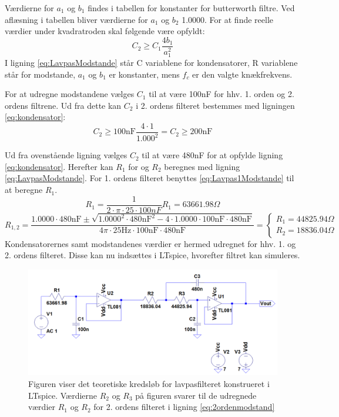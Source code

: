 \noindent Værdierne for $a_{1}$ og $b_{1}$ findes i tabellen for konstanter for butterworth filtre. Ved aflæsning i tabellen bliver værdierne for $a_{1}$  og  $b_{2}$ 1.0000. For at finde reelle værdier under kvadratroden skal følgende være opfyldt:
\begin{equation} \label{eq:kondensator}
C_2 \geq C_1 \frac{4b_1}{a_1^2}
\end{equation}
I ligning \ref{eq:LavpasModstande} står C variablene for kondensatorer, R variablene står for modstande, $a_1$ og $b_1$ er konstanter, mens $f_c$ er den valgte knækfrekvens. 

\noindent For at udregne modstandene vælges $C_1$ til at være 100nF for hhv. 1. orden og 2. ordens filtrene. Ud fra dette kan $C_2$ i 2. ordens filteret bestemmes med ligningen \ref{eq:kondensator}:
\begin{equation} 
C_2 \geq 100\text{nF} \frac{4\cdot 1}{1.000^2} = C_2 \geq 200\text{nF}
\end{equation}

\noindent Ud fra ovenstående ligning vælges $C_2$ til at være 480nF for at opfylde ligning \ref{eq:kondensator}.  Herefter kan $R_1$ for og $R_2$ beregnes med ligning \ref{eq:LavpasModstande}. For 1. ordens filteret benyttes \ref{eq:Lavpas1Modstande} til at beregne $R_1$.
\begin{equation} \label{eq:Lavpas1Modstande}
R_{1} = \frac{1}{2 \cdot \pi \cdot 25 \cdot 100nF} R_{1} = 63661.98 \Omega
\end{equation}
\begin{equation} \label{eq:2ordenmodstand}
R_{1,2} = \frac{1.0000 \cdot 480\text{nF} \pm \sqrt{1.0000^2 \cdot 480\text{nF}^2 - 4 \cdot 1.0000 \cdot 100\text{nF} \cdot 480\text{nF}}}{4 \pi \cdot 25\text{Hz} \cdot 100\text{nF} \cdot 480\text{nF}} = \begin{cases} R_{1} =  44825.94\Omega \\ R_{2} = 18836.04 \Omega \end{cases}
\end{equation}
\noindent Kondensatorernes samt modstandenes værdier er hermed udregnet for hhv. 1. og 2. ordens filteret. Disse kan nu indsættes i LTspice, hvorefter filtret kan simuleres. 

\begin{figure}[H]
	\centering
	\includegraphics[scale=0.58]{figures/cProblemloesning/Lavpasfilter1_LTspice.PNG}
	\caption{Figuren viser det teoretiske kredsløb for lavpasfilteret konstrueret i LTspice. Værdierne $R_{2}$ og $R_{3}$ på figuren svarer til de udregnede værdier $R_{1}$ og $R_{2}$ for 2. ordens filteret i ligning \ref{eq:2ordenmodstand}}
	\label{fig:lavpasfilter1_LTspice}
\end{figure}


